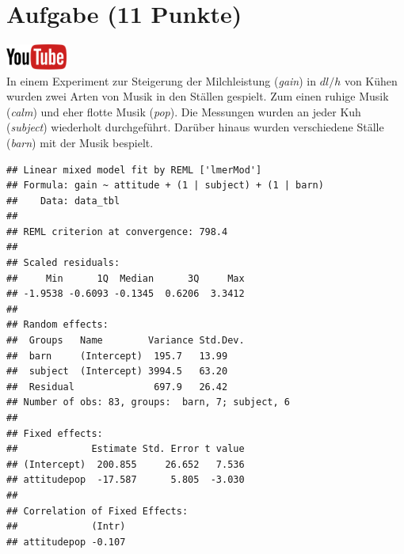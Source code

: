 \documentclass[a4paper, 10pt]{scrartcl}\usepackage[]{graphicx}\usepackage[]{xcolor}
\makeatletter
\newenvironment{kframe}{%
 \def\at@end@of@kframe{}%
 \ifinner\ifhmode%
  \def\at@end@of@kframe{\end{minipage}}%
  \begin{minipage}{\columnwidth}%
 \fi\fi%
 \def\FrameCommand##1{\hskip\@totalleftmargin \hskip-\fboxsep
 \colorbox{shadecolor}{##1}\hskip-\fboxsep
     \hskip-\linewidth \hskip-\@totalleftmargin \hskip\columnwidth}%
 \MakeFramed {\advance\hsize-\width
   \@totalleftmargin\z@ \linewidth\hsize
   \@setminipage}}%
 {\par\unskip\endMakeFramed%
 \at@end@of@kframe}
\newenvironment{knitrout}{}{} %
\makeatother
\begin{document}
\clearpage

\section{Aufgabe \hfill (11 Punkte)}

\hfill\href{https://youtu.be/ysai7umvPoA}{\includegraphics[width =
  2cm]{img/youtube}}\\[1Ex]


In einem Experiment zur Steigerung der Milchleistung (\textit{gain}) in $dl/h$ von
K{\"u}hen wurden zwei Arten von Musik in den St{\"a}llen gespielt. Zum einen ruhige
Musik (\textit{calm}) und eher flotte Musik (\textit{pop}). Die Messungen
wurden an jeder Kuh (\textit{subject}) wiederholt durchgef{\"u}hrt. Dar{\"u}ber
hinaus wurden verschiedene St{\"a}lle (\textit{barn}) mit der Musik bespielt.

\begin{knitrout}
\color{fgcolor}\begin{kframe}
\begin{verbatim}
## Linear mixed model fit by REML ['lmerMod']
## Formula: gain ~ attitude + (1 | subject) + (1 | barn)
##    Data: data_tbl
## 
## REML criterion at convergence: 798.4
## 
## Scaled residuals: 
##     Min      1Q  Median      3Q     Max 
## -1.9538 -0.6093 -0.1345  0.6206  3.3412 
## 
## Random effects:
##  Groups   Name        Variance Std.Dev.
##  barn     (Intercept)  195.7   13.99   
##  subject  (Intercept) 3994.5   63.20   
##  Residual              697.9   26.42   
## Number of obs: 83, groups:  barn, 7; subject, 6
## 
## Fixed effects:
##             Estimate Std. Error t value
## (Intercept)  200.855     26.652   7.536
## attitudepop  -17.587      5.805  -3.030
## 
## Correlation of Fixed Effects:
##             (Intr)
## attitudepop -0.107
\end{verbatim}
\end{kframe}
\end{knitrout}
\end{document}
